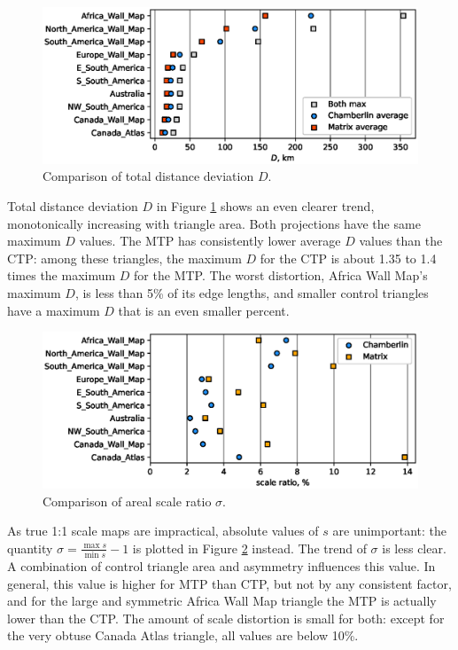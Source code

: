 \documentclass[]{interact}
\begin{document}
\begin{figure}
  \includegraphics[width=\textwidth]{distanceplot}
  \caption{Comparison of total distance deviation $D$.}
  \label{fig:distancep}
\end{figure}

Total distance deviation $D$ in Figure \ref{fig:distancep} shows an even clearer
trend, monotonically increasing with triangle area. Both projections have the
same maximum $D$ values. The MTP has consistently lower average $D$ values than
the CTP: among these triangles, the maximum $D$ for the CTP is about
1.35 to 1.4 times the maximum $D$ for the MTP. The worst distortion,
Africa Wall Map's maximum $D$, is less than 5\% of its edge lengths, and
smaller control triangles have a maximum $D$ that is an even smaller percent.

\begin{figure}
  \includegraphics[width=\textwidth]{scaleplot}
  \caption{Comparison of areal scale ratio $\sigma$.}
  \label{fig:scalep}
\end{figure}

As true 1:1 scale maps are impractical, absolute values of $s$ are unimportant:
the quantity $\sigma = \frac{\max s}{\min s} - 1$ is plotted in Figure
\ref{fig:scalep} instead. The trend of $\sigma$ is less clear. A combination of
control triangle area and asymmetry influences this value. In general, this
value is higher for MTP than CTP, but not by any consistent factor,
and for the large and symmetric Africa Wall Map triangle the MTP is
actually lower than the CTP. The amount of scale distortion is small for both:
except for the very obtuse Canada Atlas triangle, all values are below 10\%.
\end{document}
